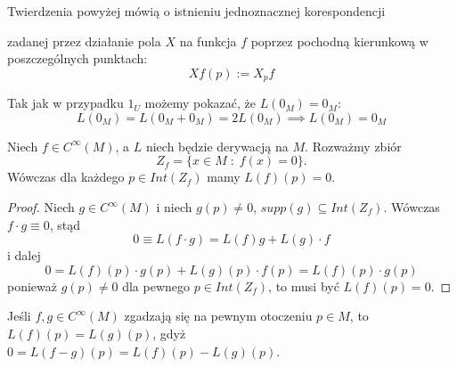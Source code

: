 Twierdzenia powyżej mówią o istnieniu jednoznacznej korespondencji

\begin{center}\end{center}
zadanej przez działanie pola $X$ na funkcja $f$ poprzez pochodną kierunkową w poszczególnych punktach:
$$Xf(p):=X_pf$$

Tak jak w przypadku $1_U$ możemy pokazać, że $L(0_M)=0_M$:
$$L(0_M)=L(0_M+0_M)=2L(0_M)\implies L(0_M)=0_M$$

\begin{lemma}
  Niech $f\in C^\infty(M)$, a $L$ niech będzie derywacją na $M$. Rozważmy zbiór
  $$Z_f=\{x\in M\;:\;f(x)=0\}.$$
  Wówczas dla każdego $p\in Int(Z_f)$ mamy $L(f)(p)=0$.
\end{lemma}

\begin{proof}
  Niech $g\in C^\infty(M)$ i niech $g(p)\neq 0$, $supp(g)\subseteq Int(Z_f)$. Wówczas $f\cdot g\equiv 0$, stąd
  $$0\equiv L(f\cdot g)=L(f)g+L(g)\cdot f$$
  i dalej
  $$0=L(f)(p)\cdot g(p)+L(g)(p)\cdot f(p)=L(f)(p)\cdot g(p)$$
  ponieważ $g(p)\neq 0$ dla pewnego $p\in Int(Z_f)$, to musi być $L(f)(p)=0$.
\end{proof}

Jeśli $f,g\in C^\infty(M)$ zgadzają się na pewnym otoczeniu $p\in M$, to $L(f)(p)=L(g)(p)$, gdyż $0=L(f-g)(p)=L(f)(p)-L(g)(p)$.
